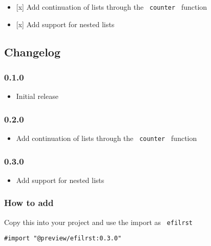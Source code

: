 \begin{itemize}
\tightlist
\item
  {[}x{]} Add continuation of lists through the \texttt{\ counter\ }
  function
\item
  {[}x{]} Add support for nested lists
\end{itemize}

\subsection{Changelog}\label{changelog}

\subsubsection{0.1.0}\label{section}

\begin{itemize}
\tightlist
\item
  Initial release
\end{itemize}

\subsubsection{0.2.0}\label{section-1}

\begin{itemize}
\tightlist
\item
  Add continuation of lists through the \texttt{\ counter\ } function
\end{itemize}

\subsubsection{0.3.0}\label{section-2}

\begin{itemize}
\tightlist
\item
  Add support for nested lists
\end{itemize}

\subsubsection{How to add}\label{how-to-add}

Copy this into your project and use the import as \texttt{\ efilrst\ }

\begin{verbatim}
#import "@preview/efilrst:0.3.0"
\end{verbatim}

